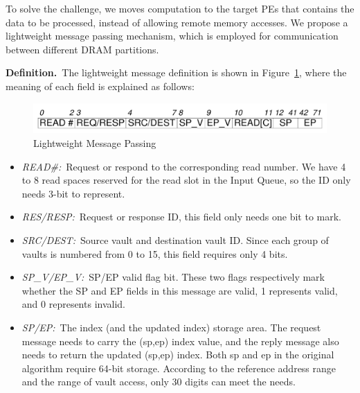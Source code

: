 \documentclass[9pt,conference]{IEEEtran}
\begin{document}
To solve the challenge, we moves computation to the target PEs that contains the data to be processed, instead of allowing remote memory accesses. We propose a lightweight message passing mechanism, which is employed for communication between different DRAM partitions.

\textbf{Definition.}~The lightweight message definition is shown in Figure~\ref{fig:message}, where the meaning of each field is explained as follows:

\begin{figure}[htbp]
    \centering
    \includegraphics[width=\linewidth]{fig/Bits.pdf}
    \caption{Lightweight Message Passing}
    \label{fig:message}
\end{figure}


\begin{itemize}
    \item \textit{READ\#:}~Request or respond to the corresponding read number. We have 4 to 8 read spaces reserved for the read slot in the Input Queue, so the ID only needs 3-bit to represent.
    \item \textit{RES/RESP:}~Request or response ID, this field only needs one bit to mark.
    \item \textit{SRC/DEST:}~Source vault and destination vault ID. Since each group of vaults is numbered from 0 to 15, this field requires only 4 bits.
    \item \textit{SP\_V/EP\_V:}~SP/EP valid flag bit. These two flags respectively mark whether the SP and EP fields in this message are valid, 1 represents valid, and 0 represents invalid.
    \item \textit{SP/EP:}~The index (and the updated index) storage area. The request message needs to carry the (sp,ep) index value, and the reply message also needs to return the updated (sp,ep) index. Both sp and ep in the original algorithm require 64-bit storage. According to the reference address range and the range of vault access, only 30 digits can meet the needs.
\end{itemize}
\end{document}
